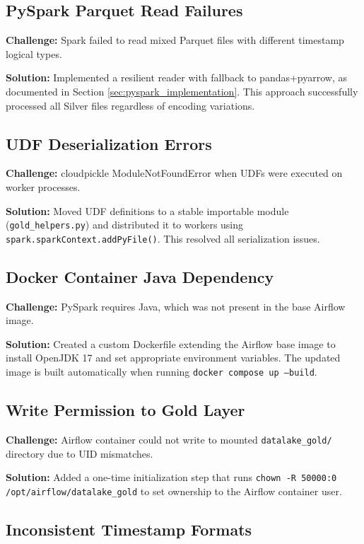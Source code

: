 \documentclass[12pt]{article}
\begin{document}
\subsection{PySpark Parquet Read Failures}

\textbf{Challenge:} Spark failed to read mixed Parquet files with different timestamp logical types.

\textbf{Solution:} Implemented a resilient reader with fallback to pandas+pyarrow, as documented in Section \ref{sec:pyspark_implementation}. This approach successfully processed all Silver files regardless of encoding variations.

\subsection{UDF Deserialization Errors}

\textbf{Challenge:} cloudpickle ModuleNotFoundError when UDFs were executed on worker processes.

\textbf{Solution:} Moved UDF definitions to a stable importable module (\texttt{gold\_helpers.py}) and distributed it to workers using \texttt{spark.sparkContext.addPyFile()}. This resolved all serialization issues.

\subsection{Docker Container Java Dependency}

\textbf{Challenge:} PySpark requires Java, which was not present in the base Airflow image.

\textbf{Solution:} Created a custom Dockerfile extending the Airflow base image to install OpenJDK 17 and set appropriate environment variables. The updated image is built automatically when running \texttt{docker compose up --build}.

\subsection{Write Permission to Gold Layer}

\textbf{Challenge:} Airflow container could not write to mounted \texttt{datalake\_gold/} directory due to UID mismatches.

\textbf{Solution:} Added a one-time initialization step that runs \texttt{chown -R 50000:0 /opt/airflow/datalake\_gold} to set ownership to the Airflow container user.

\subsection{Inconsistent Timestamp Formats}
\end{document}
